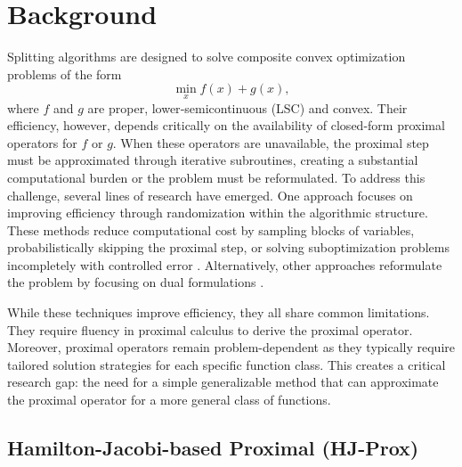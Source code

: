 \documentclass{article}
\theoremstyle{plain}
\theoremstyle{definition}
\theoremstyle{remark}
\begin{document}
\section{Background}
Splitting algorithms are designed to solve composite convex optimization problems of the form
\begin{equation}
    \min_x f(x) + g(x),
    \label{eq:min_prob}
\end{equation}
where $f$ and $g$ are proper, lower‑semicontinuous (LSC) and convex. Their efficiency, however, depends critically on the availability of closed-form proximal operators for $f$ or $g$. When these operators are unavailable, the proximal step must be approximated through iterative subroutines, creating a substantial computational burden or the problem must be reformulated.
To address this challenge, several lines of research have emerged. One approach focuses on improving efficiency through randomization within the algorithmic structure. These methods reduce computational cost by sampling blocks of variables, probabilistically skipping the proximal step, or solving suboptimization problems incompletely with controlled error \cite{Mishchenko2022ProxSkip, BonettiniPratoRebegoldi2020OO, BricenoAriasEtAl2019, CondatRichtarik2022RandProxOO}. Alternatively, other approaches reformulate the problem by focusing on dual formulations \cite{Tibshirani2017, MazumderHastie2012}.

While these techniques improve efficiency, they all share common limitations. They require fluency in proximal calculus to derive the proximal operator. Moreover, proximal operators remain problem-dependent as they typically require tailored solution strategies for each specific function class. This creates a critical research gap: the need for a simple generalizable method that can approximate the proximal operator for a more general class of functions.

\subsection{Hamilton-Jacobi-based Proximal (HJ-Prox)}
\end{document}
